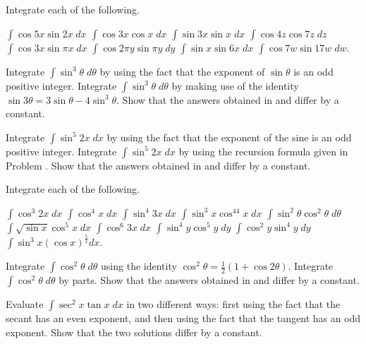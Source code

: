 \begin{exercises}

Integrate each of the following.
\begin{exenum}
\x
$\int \cos 5x \sin 2x \; dx$
\x
$\int \cos 3x \cos x \; dx$
\x
$\int \sin 3x \sin x \; dx$
\x
$\int \cos 4z \cos 7z \; dz$
\x
$\int \cos 3x \sin \pi x \; dx$
\x
$\int \cos 2\pi y \sin \pi y \; dy$
\x
$\int \sin x \sin 6x \; dx$
\x
$\int \cos 7w \sin 17w \; dw$.
\end{exenum}

\begin{exenum}
\x
{}
Integrate $\int \sin^3\theta \; d\theta$
by using the fact that the exponent of $\sin \theta$
is an odd positive integer.
\x
{}
Integrate $\int \sin^3 \theta \; d \theta$
by making use of the identity 
$\sin 3\theta = 3 \sin \theta - 4 \sin^3\theta$.
\x
Show that the answers obtained in
 and 
differ by a constant.
\end{exenum}

\begin{exenum}
\x
{}
Integrate $\int \sin^5 2x \; dx$ by using the fact
that the exponent of the sine is an odd
positive integer.
\x
{}
Integrate $\int \sin^5 2x \; dx$ by using the
recursion formula given in Problem
.
\x
Show that the answers obtained in
 and 
differ by a constant.
\end{exenum}

Integrate each of the following.
\begin{exenum}
\x
$\int \cos^3 2x \; dx$
\x
$\int \cos^4 x \; dx$
\x
$\int \sin^4 3x \; dx$
\x
$\int \sin^3 x \cos^{44} x \; dx$
\x
$\int \sin^2\theta \cos^2\theta \; d\theta$
\x
$\int \sqrt{\sin x} \cos^5 x \; dx$
\x
$\int \cos^6 3x \; dx$
\x
$\int \sin^4 y \cos^5 y \; dy$
\x
$\int \cos^2 y \sin^4 y \; dy$
\x
$\int \sin^3 x (\cos x)^{\frac52} dx$.
\end{exenum}

\begin{exenum}
\x
{}
Integrate $\int \cos^2\theta \; d\theta$
using the identity
$\cos^2\theta = \frac12(1+\cos 2\theta)$.
\x
{}
Integrate $\int \cos^2\theta \; d\theta$ by parts.
\x
Show that the answers obtained in
 and 
differ by a constant.
\end{exenum}

Evaluate $\int \sec^2 x \tan x \; dx$
in two different ways:
first using the fact that the secant has
an even exponent, and then using the
fact that the tangent has an odd exponent.
Show that the two solutions differ by a constant.


\end{exercises}
